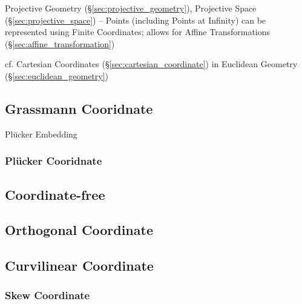 Projective Geometry (\S\ref{sec:projective_geometry}), Projective
Space (\S\ref{sec:projective_space}) -- Points (including Points at
Infinity) can be represented using Finite Coordinates; allows for
Affine Transformations (\S\ref{sec:affine_transformation})

cf. Cartesian Coordinates (\S\ref{sec:cartesian_coordinate}) in
Euclidean Geometry (\S\ref{sec:euclidean_geometry})



\subsection{Grassmann Cooridnate}\label{sec:grassmann_coordinate}

Pl\"ucker Embedding



\subsubsection{Pl\"ucker Cooridnate}\label{sec:plucker_coordinate}



\subsection{Coordinate-free}\label{sec:coordinate_free}

\subsection{Orthogonal Coordinate}\label{sec:orthogonal_coordinate}

\subsection{Curvilinear Coordinate}\label{sec:curvilinear_coordinate}

\subsubsection{Skew Coordinate}\label{sec:skew_coordinate}



